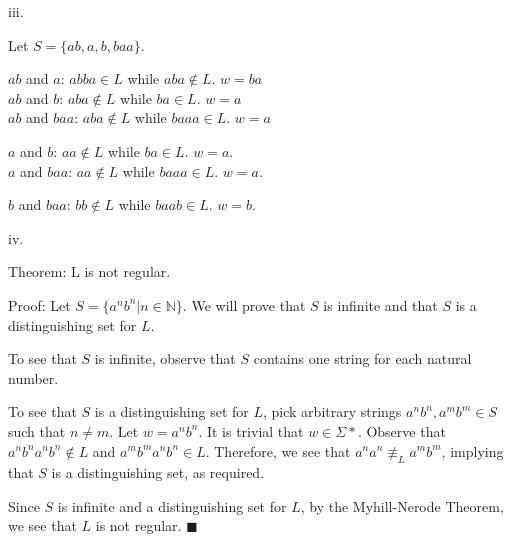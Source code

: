 \documentclass{article}
\renewcommand{\(}{\left(}
\renewcommand{\)}{\right)}
\renewcommand\qedsymbol{$\blacksquare$}
\theoremstyle{plain}
\theoremstyle{plain}
\theoremstyle{definition}
\begin{document}
    iii.
    \begin{shaded}
        Let $S=\{ab, a, b, baa\}$.

        \vspace*{4mm}

        $ab$ and $a$: $abba\in L$ while $aba\notin L$. $w=ba$ \\
        $ab$ and $b$: $aba\notin L$ while $ba\in L$. $w=a$ \\
        $ab$ and $baa$: $aba\notin L$ while $baaa\in L$. $w=a$ \\

        \vspace*{4mm}

        $a$ and $b$: $aa\notin L$ while $ba\in L$. $w=a$. \\
        $a$ and $baa$: $aa\notin L$ while $baaa\in L$. $w=a$. \\

        \vspace*{4mm}

        $b$ and $baa$: $bb\notin L$ while $baab\in L$. $w=b$.
    \end{shaded}
    
    iv.
    \begin{shaded}
        Theorem: L is not regular.

        \vspace*{4mm}

        Proof: Let $S=\{a^{n}b^{n}|n\in\mathbb{N}\}$. We will prove that $S$ is infinite and that $S$ is a distinguishing set for $L$.

        \vspace*{4mm}

        To see that $S$ is infinite, observe that $S$ contains one string for each natural number.

        \vspace*{4mm}

        To see that $S$ is a distinguishing set for $L$, pick arbitrary strings $a^{n}b^{n},a^{m}b^{m}\in S$ such that $n\neq m$. Let $w=a^{n}b^{n}$. It is trivial that $w\in\Sigma*$. Observe that $a^{n}b^{n}a^{n}b^{n}\notin L$ and $a^{m}b^{m}a^{n}b^{n}\in L$. Therefore, we see that $a^{n}a^{n}\not\equiv_L a^{m}b^{m}$, implying that $S$ is a distinguishing set, as required.

        \vspace*{4mm}

        Since $S$ is infinite and a distinguishing set for $L$, by the Myhill-Nerode Theorem, we see that $L$ is not regular. \qedsymbol
    \end{shaded}
    
\end{document}
